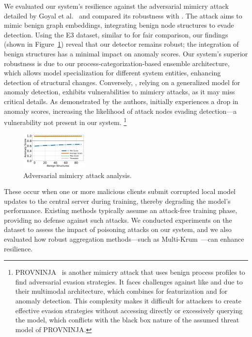   We evaluated our system's resilience against the adversarial mimicry attack detailed by Goyal et al.~\cite{goyal2023sometimes} and compared its robustness with \flash. The attack aims to mimic benign graph embeddings, integrating benign node structures to evade detection. Using the E3 dataset, similar to \flash for fair comparison, our findings (shown in Figure~\ref{mimicryattack}) reveal that our detector remains robust; the integration of benign structures has a minimal impact on anomaly scores. Our system's superior robustness is due to our process-categorization-based ensemble \gnnshort architecture, which allows model specialization for different system entities, enhancing detection of structural changes. Conversely, \flash, relying on a generalized model for anomaly detection, exhibits vulnerabilities to mimicry attacks, as it may miss critical details. As demonstrated by the authors, \flash initially experiences a drop in anomaly scores, increasing the likelihood of attack nodes evading detection—a vulnerability not present in our system. \footnote{PROVNINJA~\cite{mukherjee2023evading} is another mimicry attack that uses benign process profiles to find adversarial evasion strategies. It faces challenges against \pids like \flash and \Sys due to their multimodal architecture, which combines \wordvec for featurization and \gnnshort for anomaly detection. This complexity makes it difficult for attackers to create effective evasion strategies without accessing \wordvec directly or excessively querying the model, which conflicts with the black box nature of the assumed threat model of PROVNINJA.}

\begin{figure}[!t]
    \centering
    \includegraphics[width=0.3\textwidth]{fig/adversarial.pdf}
    \caption{Adversarial mimicry attack analysis. }
    \label{mimicryattack}
    \vspace{-2ex}
  \end{figure}


 These occur when one or more malicious clients submit corrupted local model updates to the central server during training, thereby degrading the model’s performance. Existing methods typically assume an attack-free training phase, providing no defense against such attacks. We conducted experiments on the \optc dataset to assess the impact of poisoning attacks on our system, and we also evaluated how robust aggregation methods—such as Multi-Krum~\cite{munoz2019byzantine}—can enhance resilience.

